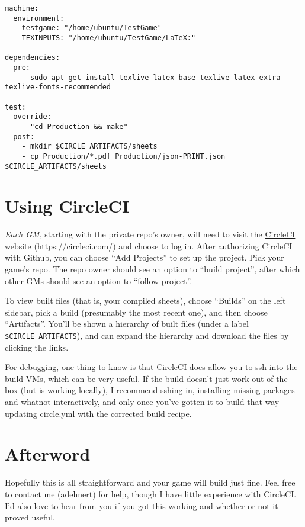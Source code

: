 \documentclass[green]{testgame}
\begin{document}
\begin{verbatim}
machine:
  environment:
    testgame: "/home/ubuntu/TestGame"
    TEXINPUTS: "/home/ubuntu/TestGame/LaTeX:"

dependencies:
  pre:
    - sudo apt-get install texlive-latex-base texlive-latex-extra texlive-fonts-recommended

test:
  override:
    - "cd Production && make"
  post:
    - mkdir $CIRCLE_ARTIFACTS/sheets
    - cp Production/*.pdf Production/json-PRINT.json $CIRCLE_ARTIFACTS/sheets
\end{verbatim}

\section{Using CircleCI}

\emph{Each GM}, starting with the private repo's owner, will need to visit the \href{https://circleci.com/}{CircleCI website} (\url{https://circleci.com/}) and choose to log in. After authorizing CircleCI with Github, you can choose ``Add Projects'' to set up the project. Pick your game's repo. The repo owner should see an option to ``build project'', after which other GMs should see an option to ``follow project''.

To view built files (that is, your compiled sheets), choose ``Builds'' on the left sidebar, pick a build (presumably the most recent one), and then choose ``Artifacts''. You'll be shown a hierarchy of built files (under a label \verb|$CIRCLE_ARTIFACTS|), and can expand the hierarchy and download the files by clicking the links.


For debugging, one thing to know is that CircleCI does allow you to ssh into the build VMs, which can be very useful. If the build doesn't just work out of the box (but is working locally), I recommend sshing in, installing missing packages and whatnot interactively, and only once you've gotten it to build that way updating circle.yml with the corrected build recipe.

\section{Afterword}

Hopefully this is all straightforward and your game will build just fine. Feel free to contact me (adehnert) for help, though I have little experience with CircleCI. I'd also love to hear from you if you got this working and whether or not it proved useful.
\end{document}
